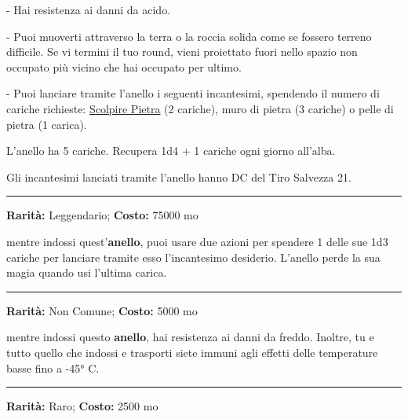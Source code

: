 \begin{multicols}{2}
\smallskip- Hai resistenza ai danni da acido.

\smallskip- Puoi muoverti attraverso la terra o la roccia solida come se fossero terreno difficile. Se vi termini il tuo round, vieni proiettato fuori nello spazio non occupato più vicino che hai occupato per ultimo.

\smallskip- Puoi lanciare tramite l'anello i seguenti incantesimi, spendendo il numero di cariche richieste: \hyperlink{Scolpire Pietra}{Scolpire Pietra} (2 cariche), muro di pietra (3 cariche) o pelle di pietra (1 carica).

\medskip

L'anello ha 5 cariche. Recupera 1d4 + 1 cariche ogni giorno all'alba.

Gli incantesimi lanciati tramite l'anello hanno DC del Tiro Salvezza 21.

\smallskip\noindent\rule{\linewidth}{2pt}  \hypertarget{AnellodeiTreDesideri}{}\medskip{}\noindent\label{AnellodeiTreDesideri}

\textbf{Rarità:} Leggendario; \textbf{Costo:} 75000 mo

mentre indossi quest'\textbf{anello}, puoi usare due azioni per spendere 1 delle sue 1d3 cariche per lanciare tramite esso l'incantesimo desiderio. L'anello perde la sua magia quando usi l'ultima carica.

\smallskip\noindent\rule{\linewidth}{2pt}  \hypertarget{AnellodelCalore}{}\medskip{}\noindent\label{AnellodelCalore}

\textbf{Rarità:} Non Comune; \textbf{Costo:} 5000 mo

mentre indossi questo \textbf{anello}, hai resistenza ai danni da freddo. Inoltre, tu e tutto quello che indossi e trasporti siete immuni agli effetti delle temperature basse fino a -45° C.

\smallskip\noindent\rule{\linewidth}{2pt}  \hypertarget{AnellodelControllodellepersone}{}\medskip{}\noindent\label{AnellodelControllodellepersone}

\textbf{Rarità:} Raro; \textbf{Costo:} 2500 mo


\end{multicols}
